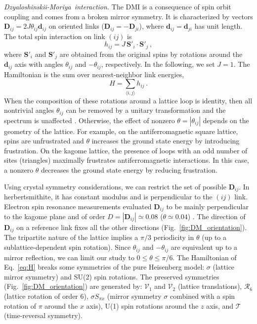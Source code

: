 \documentclass[aps,prl,twocolumn,superscriptaddress,showpacs,a4paper, longbibliography]{revtex4-1}
\newcommand{\DM}{Dzyaloshinskii-Moriya}
\begin{document}
\textit{\DM\ interaction.}
The DMI \cite{Dzyaloshinskii, Moriya} is a consequence of spin orbit coupling and comes from a broken mirror symmetry.
It is characterized by vectors $\mathbf D_{ij} = 2J\theta_{ij}\mathbf d_{ij}$ on oriented links ($\mathbf D_{ij}=-\mathbf D_{ji}$), where $\mathbf d_{ij}=\mathbf d_{ji}$ has unit length.
The total spin interaction on link $(ij)$ is \cite{DMsimple, suppMat}
\begin{equation}
\label{eq:Hlink}
h_{ij} = J \, \mathbf S'_i\cdot \mathbf S'_j\,,
\end{equation}
where $\mathbf S'_i$ and $\mathbf S'_j$ are obtained from the original spins by rotations around the $\mathbf d_{ij}$ axis with angles $\theta_{ij}$ and $-\theta_{ij}$, respectively.
In the following, we set $J=1$.
The Hamiltonian is the sum over nearest-neighbor link energies,
\begin{equation}
  \label{eq:H}
  H = \sum_{\langle i,j\rangle} h_{ij}\,.
\end{equation}
When the composition of these rotations around a lattice loop is identity, then all nontrivial angles $\theta_{ij}$ can be removed by a unitary transformation and the spectrum is unaffected \cite{Kaplan, Essafi}.
Otherwise, the effect of nonzero $\theta = |\theta_{ij}|$ depends on the geometry of the lattice.
For example, on the antiferromagnetic square lattice, spins are unfrustrated and $\theta$ increases the ground state energy by introducing frustration. On the kagome lattice, the presence of loops with an odd number of sites (triangles) maximally frustrates antiferromagnetic interactions. In this case, a nonzero $\theta$ decreases the ground state energy by reducing frustration.

Using crystal symmetry considerations, we can restrict the set of possible $\mathbf D_{ij}$.
In herbertsmithite, it has constant modulus and is perpendicular to the $(ij)$ link.
Electron spin resonance measurements evaluated $\mathbf D_{ij}$ to be mainly perpendicular to the kagome plane and of order $D = |\mathbf D_{ij}| \simeq 0.08$ ($\theta\simeq 0.04$) \cite{DM_Bert}.
The direction of $\mathbf D_{ij}$ on a reference link fixes all the other directions (Fig.~\ref{fig:DM_orientation}).
The tripartite nature of the lattice implies a $\pi/3$ periodicity in $\theta$ (up to a sublattice-dependent spin rotation).
Since $\theta_{ij}$ and $-\theta_{ij}$ are equivalent up to a mirror reflection, we can limit our study to $0\leq\theta\leq\pi/6$.
The Hamiltonian of Eq.~\eqref{eq:H} breaks some symmetries of the pure Heisenberg model:
$\sigma$ (lattice mirror symmetry) and
SU(2) spin rotations.
The preserved symmetries (Fig.~\ref{fig:DM_orientation}) are generated by:
$\mathcal V_1$ and $\mathcal V_2$ (lattice translations),
$\mathcal R_6$ (lattice rotation of order 6),
$\mathcal \sigma S_{\pi x}$ (mirror symmetry $\sigma$ combined with a spin rotation of $\pi$ around the $x$ axis), U(1) spin rotations around the $z$ axis, and $\mathcal T$ (time-reversal symmetry).
\end{document}
